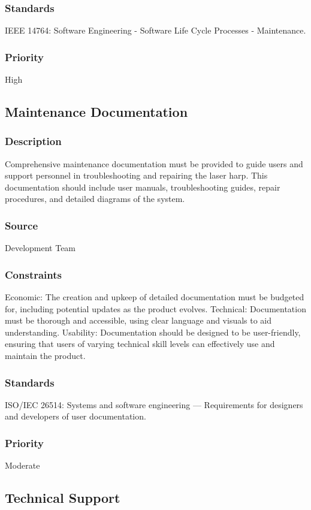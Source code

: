 \subsubsection{Standards}
IEEE 14764: Software Engineering - Software Life Cycle Processes - Maintenance.
\subsubsection{Priority}
High


\subsection{Maintenance Documentation}
\subsubsection{Description}
Comprehensive maintenance documentation must be provided to guide users and support personnel in troubleshooting and repairing the laser harp. This documentation should include user manuals, troubleshooting guides, repair procedures, and detailed diagrams of the system.
\subsubsection{Source}
Development Team
\subsubsection{Constraints}
Economic: The creation and upkeep of detailed documentation must be budgeted for, including potential updates as the product evolves.
Technical: Documentation must be thorough and accessible, using clear language and visuals to aid understanding.
Usability: Documentation should be designed to be user-friendly, ensuring that users of varying technical skill levels can effectively use and maintain the product.
\subsubsection{Standards}
ISO/IEC 26514: Systems and software engineering — Requirements for designers and developers of user documentation.
\subsubsection{Priority}
Moderate


\subsection{Technical Support}
